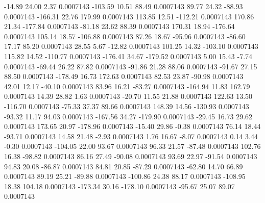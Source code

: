       -14.89       24.00        2.37     0.0007143
     -103.59       10.51       88.49     0.0007143
       89.77       24.32      -88.93     0.0007143
     -166.31       22.76      179.99     0.0007143
      113.85       12.51     -112.21     0.0007143
      170.86       21.34     -177.84     0.0007143
      -81.18       23.62       88.39     0.0007143
      170.31       18.94     -176.64     0.0007143
      105.14       18.57     -106.88     0.0007143
       87.26       18.67      -95.96     0.0007143
      -86.60       17.17       85.20     0.0007143
       28.55        5.67      -12.82     0.0007143
      101.25       14.32     -103.10     0.0007143
      115.82       14.52     -110.77     0.0007143
     -176.41       34.67     -179.52     0.0007143
        5.00       15.43       -7.74     0.0007143
      -69.44       26.22       87.82     0.0007143
      -91.86       21.28       88.06     0.0007143
      -91.67       27.15       88.50     0.0007143
     -178.49       16.73      172.63     0.0007143
       82.53       23.87      -90.98     0.0007143
       42.01       12.17      -40.10     0.0007143
       83.96       16.21      -83.27     0.0007143
     -164.94       11.83      162.79     0.0007143
       14.39       28.82        1.63     0.0007143
      -20.70       11.55       21.88     0.0007143
      122.63       13.50     -116.70     0.0007143
      -75.33       37.37       89.66     0.0007143
      148.39       14.56     -130.93     0.0007143
      -93.32       11.17       94.03     0.0007143
     -167.56       34.27     -179.90     0.0007143
      -29.45       16.73       29.62     0.0007143
      173.65       20.97     -178.96     0.0007143
      -15.40       29.86       -0.38     0.0007143
       76.14       18.44      -93.71     0.0007143
       14.58       21.48       -2.93     0.0007143
        1.76       16.67       -8.07     0.0007143
        0.14        3.44       -0.30     0.0007143
     -104.05       22.00       93.67     0.0007143
       96.33       21.57      -87.48     0.0007143
      102.76       16.38      -98.82     0.0007143
       86.16       27.49      -90.08     0.0007143
       93.69       22.97      -91.54     0.0007143
       94.83       20.08      -86.87     0.0007143
       84.81       20.85      -87.29     0.0007143
      -62.80       14.70       66.89     0.0007143
       89.19       25.21      -89.88     0.0007143
     -100.86       24.38       88.17     0.0007143
     -108.95       18.38      104.18     0.0007143
     -173.34       30.16     -178.10     0.0007143
      -95.67       25.07       89.07     0.0007143
